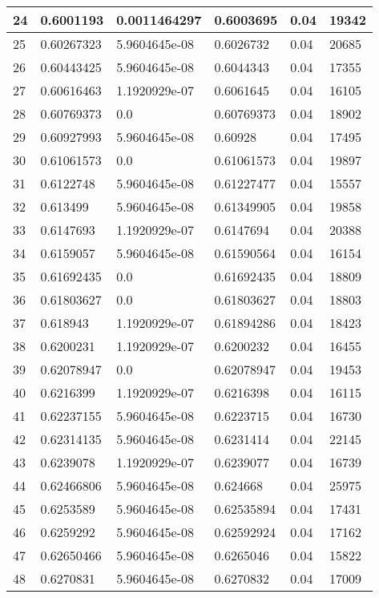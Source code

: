 \begin{longtable}{|l|l|l|l|l|l|}
24 & 0.6001193 & 0.0011464297 & 0.6003695 & 0.04 & 19342 \\ \hline 
25 & 0.60267323 & 5.9604645e-08 & 0.6026732 & 0.04 & 20685 \\ \hline 
26 & 0.60443425 & 5.9604645e-08 & 0.6044343 & 0.04 & 17355 \\ \hline 
27 & 0.60616463 & 1.1920929e-07 & 0.6061645 & 0.04 & 16105 \\ \hline 
28 & 0.60769373 & 0.0 & 0.60769373 & 0.04 & 18902 \\ \hline 
29 & 0.60927993 & 5.9604645e-08 & 0.60928 & 0.04 & 17495 \\ \hline 
30 & 0.61061573 & 0.0 & 0.61061573 & 0.04 & 19897 \\ \hline 
31 & 0.6122748 & 5.9604645e-08 & 0.61227477 & 0.04 & 15557 \\ \hline 
32 & 0.613499 & 5.9604645e-08 & 0.61349905 & 0.04 & 19858 \\ \hline 
33 & 0.6147693 & 1.1920929e-07 & 0.6147694 & 0.04 & 20388 \\ \hline 
34 & 0.6159057 & 5.9604645e-08 & 0.61590564 & 0.04 & 16154 \\ \hline 
35 & 0.61692435 & 0.0 & 0.61692435 & 0.04 & 18809 \\ \hline 
36 & 0.61803627 & 0.0 & 0.61803627 & 0.04 & 18803 \\ \hline 
37 & 0.618943 & 1.1920929e-07 & 0.61894286 & 0.04 & 18423 \\ \hline 
38 & 0.6200231 & 1.1920929e-07 & 0.6200232 & 0.04 & 16455 \\ \hline 
39 & 0.62078947 & 0.0 & 0.62078947 & 0.04 & 19453 \\ \hline 
40 & 0.6216399 & 1.1920929e-07 & 0.6216398 & 0.04 & 16115 \\ \hline 
41 & 0.62237155 & 5.9604645e-08 & 0.6223715 & 0.04 & 16730 \\ \hline 
42 & 0.62314135 & 5.9604645e-08 & 0.6231414 & 0.04 & 22145 \\ \hline 
43 & 0.6239078 & 1.1920929e-07 & 0.6239077 & 0.04 & 16739 \\ \hline 
44 & 0.62466806 & 5.9604645e-08 & 0.624668 & 0.04 & 25975 \\ \hline 
45 & 0.6253589 & 5.9604645e-08 & 0.62535894 & 0.04 & 17431 \\ \hline 
46 & 0.6259292 & 5.9604645e-08 & 0.62592924 & 0.04 & 17162 \\ \hline 
47 & 0.62650466 & 5.9604645e-08 & 0.6265046 & 0.04 & 15822 \\ \hline 
48 & 0.6270831 & 5.9604645e-08 & 0.6270832 & 0.04 & 17009 \\ \hline 

\end{longtable}
